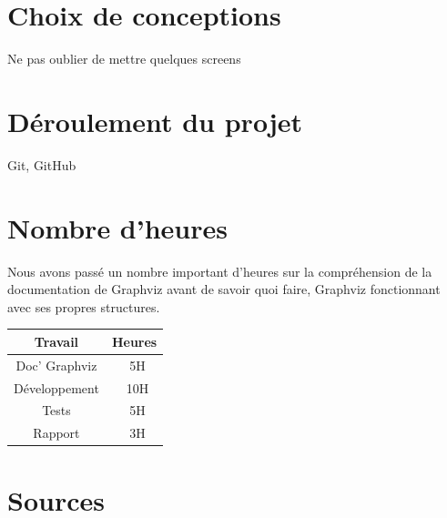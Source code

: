 \documentclass[12pt,a4paper]{report}
\begin{document}
\section{Choix de conceptions}
Ne pas oublier de mettre quelques screens

\section{Déroulement du projet}
Git, GitHub

\section{Nombre d'heures}
Nous avons passé un nombre important d'heures sur la compréhension de la documentation de Graphviz avant de savoir quoi faire, Graphviz fonctionnant avec ses propres structures.

\begin{tabular}{|c|c|}
  \hline
  Travail & Heures \\
  \hline
  Doc' Graphviz & ~5H \\
  \hline
  Développement	&	~10H \\
  \hline
  Tests	&	~5H \\ 
  \hline
  Rapport	&	~3H \\
  \hline
\end{tabular}

\section{Sources}
\end{document}
